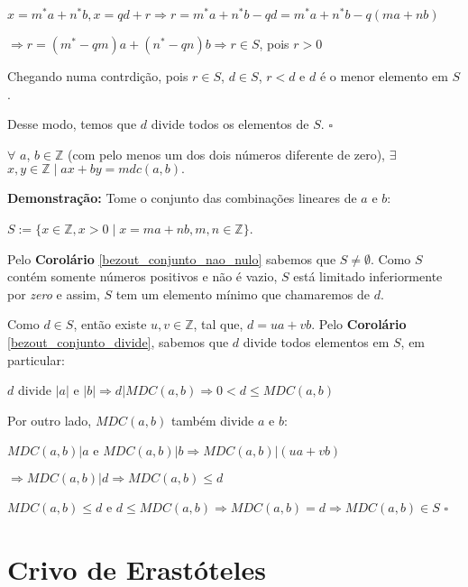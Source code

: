 $x = m^*a + n^*b, x = qd + r \Rightarrow r = m^*a + n^*b - qd = m^*a + n^*b - q(ma + nb)$ 

$\Rightarrow r = (m^* - qm)a + (n^* - qn)b \Rightarrow r \in S$, pois $r > 0$

Chegando numa contrdição, pois $r \in S$, $d \in S$, $r < d$ e $d$ é o menor elemento em $S$.

Desse modo, temos que $d$ divide todos os elementos de $S$. $\square$


\begin{theorem}\label{teorema_bezout}
$\forall$ $a$, $b \in \mathbb{Z}$ (com pelo menos um dos dois números diferente de zero), $\exists$ $x, y \in \mathbb{Z} \mid ax + by = mdc(a, b).$
\end{theorem}
\textbf{Demonstração:}
Tome o conjunto das combinações lineares de $a$ e $b$:

$S := \{x\in\mathbb{Z}, x>0 \mid x = ma + nb, m,n\in \mathbb{Z}\}$.

Pelo \textbf{Corolário} \autoref{bezout_conjunto_nao_nulo} sabemos que $S \neq \emptyset$. Como $S$ contém somente números positivos e não é vazio, 
$S$ está limitado inferiormente por \textit{zero} e assim, $S$ tem um elemento mínimo que chamaremos de $d$.

Como $d \in S$, então existe $u, v\in \mathbb{Z}$, tal que, $d = ua + vb$. Pelo \textbf{Corolário} \autoref{bezout_conjunto_divide}, sabemos que $d$ divide todos elementos em $S$, em particular:

$d$ divide $|a|$ e $|b| \Rightarrow d|MDC(a,b) \Rightarrow 0 < d \leq MDC(a,b)$

Por outro lado, $MDC(a,b)$ também divide $a$ e $b$:

$MDC(a,b)|a$ e $MDC(a,b)|b \Rightarrow MDC(a,b)|(ua + vb)$

$ \Rightarrow MDC(a,b)|d \Rightarrow MDC(a,b) \leq d$

$MDC(a,b)\leq d$ e $d \leq MDC(a,b) \Rightarrow MDC(a,b) = d \Rightarrow MDC(a,b) \in S$ $\square$






\section{Crivo de Erastóteles}

